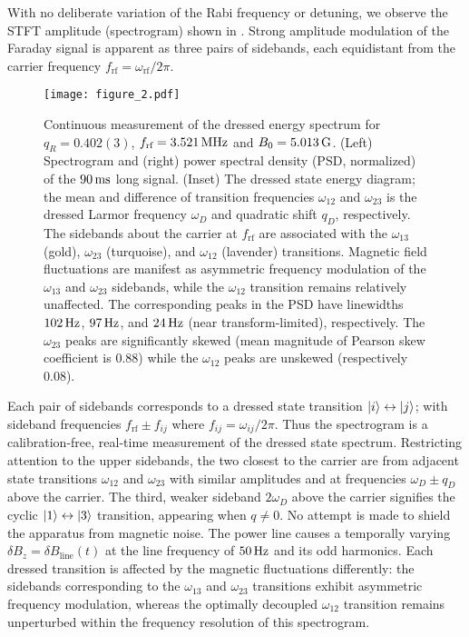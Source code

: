 \documentclass[aps,prl,reprint,superscriptaddress,floatfix]{revtex4-1}
\begin{document}
With no deliberate variation of the Rabi frequency or detuning, we observe the STFT amplitude (spectrogram) shown in .
Strong amplitude modulation of the Faraday signal is apparent as three pairs of sidebands, each equidistant from the carrier frequency $f_{\text{rf}} = \omega_{\text{rf}}/2\pi$. 
\begin{figure}
    \texttt{[image: figure\_2.pdf]}
    \caption{
    \label{fig:static_coupling}
    Continuous measurement of the dressed energy spectrum for $q_R = 0.402(3)$, $f_{\text{rf}}=\unit[3.521]{MHz}$ and $B_0=\unit[5.013]{G}$.
    (Left) Spectrogram and (right) power spectral density (PSD, normalized) of the $\unit[90]{ms}$ long signal. 
    (Inset) The dressed state energy diagram; the mean and difference of transition frequencies $\omega_{12}$ and $\omega_{23}$ is the dressed Larmor frequency $\omega_D$ and quadratic shift $q_D$, respectively.
    The sidebands about the carrier at $f_{\text{rf}}$ are associated with the $\omega_{13}$ (gold), $\omega_{23}$ (turquoise), and $\omega_{12}$ (lavender) transitions.
    Magnetic field fluctuations are manifest as asymmetric frequency modulation of the $\omega_{13}$ and $\omega_{23}$ sidebands, while the $\omega_{12}$ transition remains relatively unaffected.
    The corresponding peaks in the PSD have linewidths $\unit[102]{Hz}$, $\unit[97]{Hz}$, and $\unit[24]{Hz}$ (near transform-limited), respectively.
    The $\omega_{23}$ peaks are significantly skewed (mean magnitude of Pearson skew coefficient is $0.88$) while the $\omega_{12}$ peaks are unskewed (respectively $0.08$).
    }
\end{figure}
Each pair of sidebands corresponds to a dressed state transition $\vert i \rangle  \leftrightarrow \vert j \rangle $; with sideband frequencies  $f_{\text{rf}} \pm f_{ij}$ where $f_{ij} = \omega_{ij}/2\pi$.
Thus the spectrogram is a calibration-free, real-time measurement of the dressed state spectrum.
Restricting attention to the upper sidebands, the two closest to the carrier are from adjacent state transitions $\omega_{12}$ and $\omega_{23}$ with similar amplitudes and at frequencies $\omega_D \pm q_D$ above the carrier.
The third, weaker sideband $2\omega_D$ above the carrier signifies the cyclic $\vert 1 \rangle  \leftrightarrow \vert 3 \rangle $ transition, appearing when $q\neq 0$. 
No attempt is made to shield the apparatus from magnetic noise.
The power line causes a temporally varying $\delta B_z = \delta B_{\text{line}}(t)$ at the line frequency of $\unit[50]{Hz}$ and its odd harmonics.
Each dressed transition is affected by the magnetic fluctuations differently: the sidebands corresponding to the $\omega_{13}$ and $\omega_{23}$ transitions exhibit asymmetric frequency modulation, whereas the optimally decoupled $\omega_{12}$ transition remains unperturbed within the frequency resolution of this spectrogram.
\end{document}
